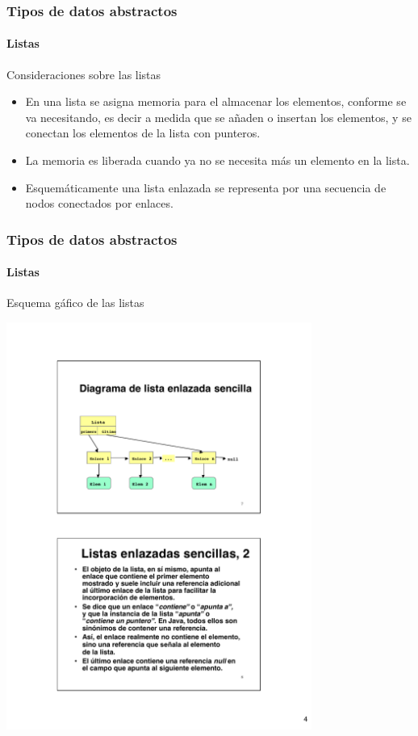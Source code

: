 \documentclass{beamer}
\begin{document}
		\begin{frame}
			\frametitle{Tipos de datos abstractos}
			\framesubtitle{Listas}

			\begin{block}{Consideraciones sobre las listas}
				\begin{itemize}
					\item En una lista se asigna memoria para el almacenar los elementos, conforme se va necesitando, es decir a medida que se a\~naden o insertan los elementos, y se conectan los elementos de la lista con punteros. 
					\item La memoria es liberada cuando ya no se necesita m\'as un elemento en la lista. 
					\item Esquem\'aticamente una lista enlazada se representa por una secuencia de nodos conectados por enlaces.
				\end{itemize}
			\end{block}
		\end{frame}

		\begin{frame}
			\frametitle{Tipos de datos abstractos}
			\framesubtitle{Listas}

			\begin{block}{Esquema g\'afico de las listas}
				\begin{center}
					\includegraphics[width=10cm]{images/esquema.pdf}
				\end{center}
			\end{block}
		\end{frame}
\end{document}
